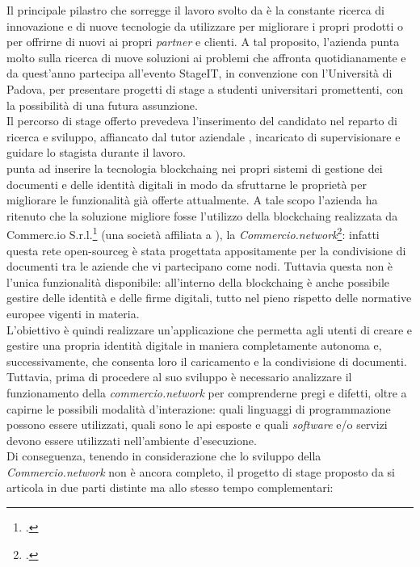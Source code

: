 Il principale pilastro che sorregge il lavoro svolto da \myCompany{} \companyTitle{} è la constante ricerca di innovazione e di nuove tecnologie da utilizzare per migliorare i propri prodotti o per offrirne di nuovi ai propri \textit{partner} e clienti. A tal proposito, l'azienda punta molto sulla ricerca di nuove soluzioni ai problemi che affronta quotidianamente e da quest'anno partecipa all'evento StageIT, in convenzione con l'Università di Padova, per presentare progetti di stage a studenti universitari promettenti, con la possibilità di una futura assunzione.\\
Il percorso di stage offerto prevedeva l'inserimento del candidato nel reparto di ricerca e sviluppo, affiancato dal tutor aziendale \myTutor, incaricato di supervisionare e guidare lo stagista durante il lavoro.\\
\myCompany{} \companyTitle{} punta ad inserire la tecnologia \gls{blockchaing}\glsfirstoccur{} nei propri sistemi di gestione dei documenti e delle identità digitali in modo da sfruttarne le proprietà per migliorare le funzionalità già offerte attualmente. A tale scopo l'azienda ha ritenuto che la soluzione migliore fosse l'utilizzo della \gls{blockchaing} realizzata da Commerc.io S.r.l.\footcite{site:commerc-io} (una società affiliata a \myCompany{} \companyTitle), la \textit{Commercio.network}\footcite{site:commercio-network}: infatti questa rete \gls{open-sourceg}\glsfirstoccur{} è stata progettata appositamente per la condivisione di documenti tra le aziende che vi partecipano come nodi. Tuttavia questa non è l'unica funzionalità disponibile: all'interno della \gls{blockchaing} è anche possibile gestire delle identità e delle firme digitali, tutto nel pieno rispetto delle normative europee vigenti in materia.\\
L'obiettivo è quindi realizzare un'applicazione che permetta agli utenti di creare e gestire una propria identità digitale in maniera completamente autonoma e, successivamente, che consenta loro il caricamento e la condivisione di documenti. Tuttavia, prima di procedere al suo sviluppo è necessario analizzare il funzionamento della \textit{commercio.network} per comprenderne pregi e difetti, oltre a capirne le possibili  modalità d'interazione: quali linguaggi di programmazione possono essere utilizzati, quali sono le \gls{api}\glsfirstoccur{} esposte e quali \textit{software} e/o servizi devono essere utilizzati nell'ambiente d'esecuzione.\\
Di conseguenza, tenendo in considerazione che lo sviluppo della \textit{Commercio.network} non è ancora completo, il progetto di stage proposto da \myCompany{} \companyTitle{} si articola in due parti distinte ma allo stesso tempo complementari:

